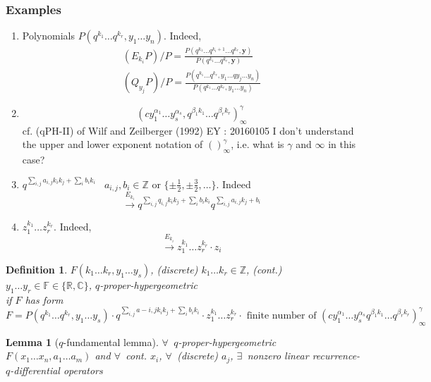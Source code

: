 \documentclass[10pt]{amsart}
\newtheorem{lemma}{Lemma}
\newtheorem{definition}{Definition}
\begin{document}
\begin{multicols*}{2}
\subsubsection{Examples}
\begin{enumerate}
\item  Polynomials $P(q^{k_1} \dots q^{k_r}, y_1 \dots y_n)$.  Indeed, 
\[
\begin{gathered}
  (E_{k_i}P)/P = \frac{ P(q^{k_1} \dots q^{k_i +1} \dots q^{k_r}, \mathbf{y}) }{ P(q^{k_1} \dots q^{k_r}, \mathbf{y}) } \\
  (Q_{y_j}P)/P = \frac{ P(q^{k_1} \dots q^{k_r}, y_1 \dots qy_j \dots y_n ) }{ P(q^{k_1} \dots q^{k_r},y_1 \dots y_n ) } \end{gathered}
\]
\item \[
(cy_1^{\alpha_1} \dots y_s^{\alpha_s}, q^{\beta_1 k_1} \dots q^{\beta_r k_r})^{\gamma}_{\infty}
\]cf. (qPH-II) of Wilf and Zeilberger (1992) \cite{HWilfDZeilberger1992} EY : 20160105 I don't understand the upper and lower exponent notation of $()^{\gamma}_{\infty}$, i.e. what is $\gamma$ and $\infty$ in this case?
\item $q^{\sum_{i,j} a_{i,j} k_i k_j + \sum_i b_i k_i }$ \quad \, $a_{i,j},b_i \in \mathbb{Z}$ or $\lbrace \pm \frac{1}{2}, \pm \frac{3}{2} , \dots \rbrace$.  Indeed
\[
\xrightarrow{ E_{k_i} } q^{\sum_{i,j} q_{i,j} k_i k_j + \sum_i b_i k_i } q^{\sum_{i,j}a_{i,j}k_j + b_i}
\]
\item $z_1^{k_1} \dots z_r^{k_r}$.  Indeed,
\[
\xrightarrow{E_{k_i}} z_1^{k_1} \dots z_r^{k_r} \cdot z_i
\]
\end{enumerate}

\begin{definition}
$F(k_1\dots k_r,y_1 \dots y_s)$, (discrete) $k_1 \dots k_r \in \mathbb{Z}$, (cont.) $y_1 \dots y_r \in \mathbb{F} \in \lbrace \mathbb{R}, \mathbb{C} \rbrace$, \emph{$q$-proper-hypergeometric} \\
if $F$ has form $F = P(q^{k_1} \dots q^{k_r}, y_1 \dots y_s) \cdot q^{ \sum_{i,j} a-{i,j}k_ik_j + \sum_i b_i k_i } \cdot z_1^{k_1} \dots z_r^{k_r} \cdot \text{ finite number of } (cy_1^{\alpha_1} \dots y_s^{\alpha_s} q^{\beta_1 k_1} \dots q^{\beta_r k_r } )_{\infty}^{\gamma}$
\end{definition}

\begin{lemma}[$q$-fundamental lemma]
$\forall \, $ $q$-proper-hypergeometric $F(x_1\dots x_n,a_1 \dots a_m)$ and $\forall \, $ cont. $x_i$, $\forall \, $ (discrete) $a_j$, $\exists \, $ nonzero linear recurrence-$q$-differential operators


\end{lemma}
\end{multicols*}
\end{document}
